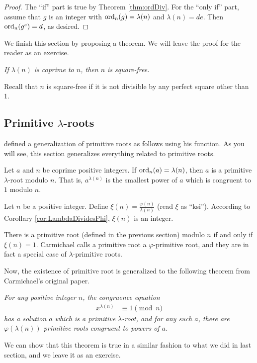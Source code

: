 \documentclass{subfile}
\begin{document}
	\begin{proof}
		The ``if'' part is true by Theorem \ref{thm:ordDiv}. For the ``only if'' part, assume that $g$ is an integer with $\operatorname{ord}_n(g)=\lambda(n)$ and $\lambda(n)=de$. Then $\operatorname{ord}_n(g^e)=d$, as desired.
	\end{proof}
	
	We finish this section by proposing a theorem. We will leave the proof for the reader as an exercise.
		\begin{theorem}\slshape
			If $\lambda(n)$ is coprime to $n$, then $n$ is square-free.
		\end{theorem}
	Recall that $n$ is square-free if it is not divisible by any perfect square other than $1$.
	
	\subsection{Primitive $\lambda$-roots}
	\textcite[Page $232-233$, Result II]{carmichael1910} defined a generalization of primitive roots as follows using his function. As you will see, this section generalizes everything related to primitive roots.
	\begin{definition}
		Let $a$ and $n$ be coprime positive integers. If $\operatorname{ord}_n(a)=\lambda(n)$, then $a$ is a primitive $\lambda$-root modulo $n$. That is, $a^{\lambda(n)}$ is the smallest power of $a$ which is congruent to $1$ modulo $n$. 
	\end{definition}

	\begin{definition}
		Let $n$ be a positive integer. Define $\xi(n) = \frac{\varphi(n)}{\lambda(n)}$ (read $\xi$ as ``ksi''). According to Corollary \ref{cor:LambdaDividesPhi}, $\xi(n)$ is an integer.
	\end{definition}

	\begin{proposition}
		 There is a primitive root (defined in the previous section) modulo $n$ if and only if $\xi(n)=1$. Carmichael calls a primitive root a $\varphi$-primitive root, and they are in fact a special case of $\lambda$-primitive roots.
	\end{proposition}

	Now, the existence of primitive root is generalized to the following theorem from Carmichael's original paper.
	\begin{theorem}[Carmicahel]\slshape
		For any positive integer $n$, the congruence equation
			\begin{align*}
				x^{\lambda(n)} & \equiv1\pmod n
			\end{align*}
		has a solution $a$ which is a primitive $\lambda$-root, and for any such $a$, there are $\varphi(\lambda(n))$ primitive roots congruent to powers of $a$.
	\end{theorem}
	We can show that this theorem is true in a similar fashion to what we did in last section, and we leave it as an exercise.
	
\end{document}
